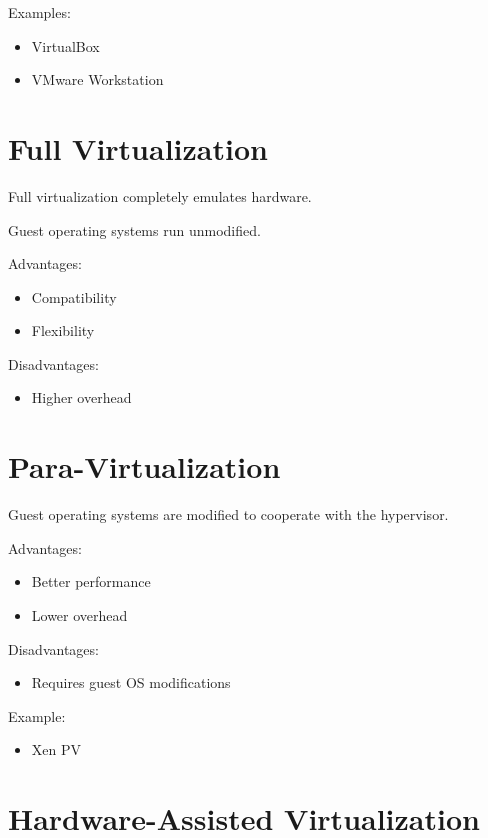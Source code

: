 Examples:

\begin{itemize}
\item VirtualBox
\item VMware Workstation
\end{itemize}

\section{Full Virtualization}

Full virtualization completely emulates hardware.

Guest operating systems run unmodified.

Advantages:

\begin{itemize}
\item Compatibility
\item Flexibility
\end{itemize}

Disadvantages:

\begin{itemize}
\item Higher overhead
\end{itemize}

\section{Para-Virtualization}

Guest operating systems are modified to cooperate with the hypervisor.

Advantages:

\begin{itemize}
\item Better performance
\item Lower overhead
\end{itemize}

Disadvantages:

\begin{itemize}
\item Requires guest OS modifications
\end{itemize}

Example:

\begin{itemize}
\item Xen PV
\end{itemize}

\section{Hardware-Assisted Virtualization}

